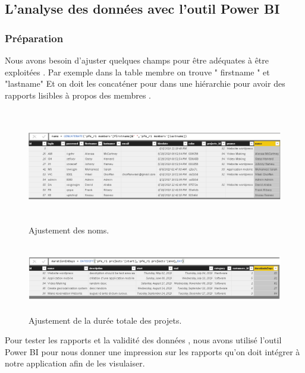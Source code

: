 \subsection{  L'analyse des donn\'{e}es avec   l'outil Power BI }


\subsubsection{Pr\'{e}paration}
Nous avons besoin d'ajuster quelques champs pour \^{e}tre ad\'{e}quates \`{a} \^{e}tre
exploit\'{e}es . Par exemple dans la table membre on trouve " firstname " et
"lastname" Et on doit les concat\'{e}ner pour dans une hi\'{e}rarchie pour avoir
des rapports lisibles \`{a} propos des membres .





\begin{figure}[H]
\center
\includegraphics[width=14cm,height=5cm]{./figures/pb1.png}
\caption{Ajustement des noms.}
\end{figure}



\bigskip
\bigskip


\begin{figure}[H]
\center
\includegraphics[width=14cm,height=3cm]{./figures/pb2.png}
\caption{Ajustement de la dur\'{e}e totale des projets.}
\end{figure}


Pour tester les rapports et la validit\'{e} des donn\'{e}es , nous avons utilis\'{e} l'outil
Power BI pour nous donner une impression sur les rapports qu'on doit
int\'{e}grer \`{a} notre application afin de les visulaiser.

